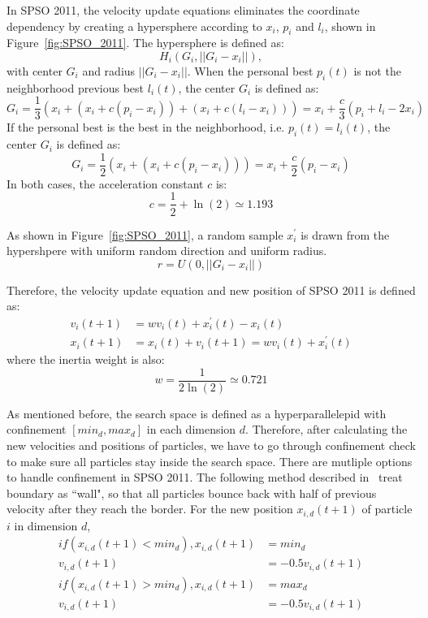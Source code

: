 In SPSO 2011, the velocity update equations eliminates the coordinate dependency by creating a hypersphere according to $x_i$, $p_i$ and $l_i$, shown in Figure~\ref{fig:SPSO_2011}.
The hypersphere is defined as:
\begin{displaymath}
H_i(G_i, ||G_i - x_i||),
\end{displaymath}
with center $G_i$ and radius $||G_i - x_i||$.
When the personal best $p_i(t)$ is not the neighborhood previous best $l_i(t)$, the center $G_i$ is defined as:
\begin{displaymath}
G_i = \frac{1}{3} (x_i + (x_i + c(p_i - x_i)) + (x_i + c(l_i - x_i))) = x_i + \frac{c}{3}(p_i + l_i - 2x_i) 
\end{displaymath}
If the personal best is the best in the neighborhood, i.e. $p_i(t) = l_i(t)$, the center $G_i$ is defined as:
\begin{displaymath}
G_i = \frac{1}{2} (x_i + (x_i + c(p_i - x_i))) = x_i + \frac{c}{2}(p_i - x_i)
\end{displaymath}
In both cases, the acceleration constant $c$ is:
\begin{displaymath}
c = \frac{1}{2} + \ln(2) \simeq 1.193
\end{displaymath}

As shown in Figure~\ref{fig:SPSO_2011}, a random sample $x^{'}_{i}$ is drawn from the hypershpere with uniform random direction and uniform radius.
\begin{displaymath}
r = U(0, ||G_i - x_i||)
\end{displaymath} 

Therefore, the velocity update equation and new position of SPSO 2011 is defined as:
\begin{align*}
v_i(t+1) &= wv_i(t) + x_{i}^{'}(t) - x_i(t) \\
x_i(t+1) &= x_i(t) + v_i(t+1) = wv_i(t) + x_{i}^{'}(t) 
\end{align*} 
where the inertia weight is also:
\begin{displaymath}
w = \frac{1}{2\ln(2)} \simeq 0.721
\end{displaymath} 


As mentioned before, the search space is defined as a hyperparallelepid with confinement $[min_d, max_d]$ in each dimension $d$.
Therefore, after calculating the new velocities and positions of particles, we have to go through confinement check to make sure all particles stay inside the search space.
There are mutliple options to handle confinement in SPSO 2011.
The following method described in~\cite{Clerc:2012:SPSO2011} treat boundary as ``wall", so that all particles bounce back with half of previous velocity after they reach the border.
For the new position $x_{i,d}(t+1)$ of particle $i$ in dimension $d$,
\begin{align*}
if (x_{i,d}(t+1) < min_d), x_{i,d}(t+1) &= min_d \\
                           v_{i,d}(t+1) &= -0.5v_{i,d}(t+1) \\
if (x_{i,d}(t+1) > min_d), x_{i,d}(t+1) &= max_d \\
                           v_{i,d}(t+1) &= -0.5v_{i,d}(t+1) \end{align*} 


